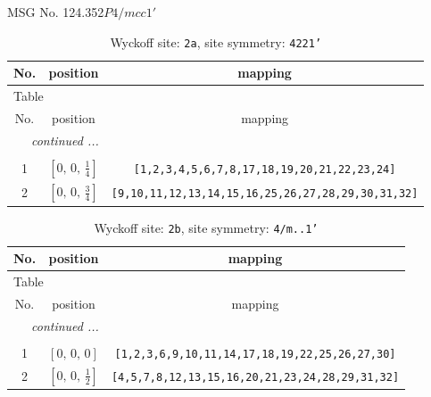 \documentclass[fleqn,8pt]{jsarticle}
\begin{document}
\setcounter{MaxMatrixCols}{32}

\renewcommand{\tablename}{Table~}
\renewcommand{\figurename}{Figure~}
\begin{center}
\LARGE
MSG No. 124.352\quad$P4/mcc1'$
\end{center}
\renewcommand{\arraystretch}{1.2}
\begin{longtable}{ccc}
\caption{Wyckoff site: {\tt 2a}, site symmetry: {\tt 4221'}}
 \\
 \hline \hline
No. & position & mapping \\ \hline \endfirsthead

\multicolumn{2}{l}{\tablename\ \thetable{}} \\
 \hline \hline
No. & position & mapping \\ \hline \endhead

 \hline \hline
\multicolumn{2}{r}{\footnotesize\it continued ...} \\ \endfoot

 \hline \hline
\multicolumn{2}{r}{} \\ \endlastfoot

1 & $\left[ 0,\, 0,\, \frac{1}{4} \right]$ & {\tt [1,2,3,4,5,6,7,8,17,18,19,20,21,22,23,24]} \\ \hline
2 & $\left[ 0,\, 0,\, \frac{3}{4} \right]$ & {\tt [9,10,11,12,13,14,15,16,25,26,27,28,29,30,31,32]} \\
\end{longtable}
\renewcommand{\arraystretch}{1.2}
\begin{longtable}{ccc}
\caption{Wyckoff site: {\tt 2b}, site symmetry: {\tt 4/m..1'}}
 \\
 \hline \hline
No. & position & mapping \\ \hline \endfirsthead

\multicolumn{2}{l}{\tablename\ \thetable{}} \\
 \hline \hline
No. & position & mapping \\ \hline \endhead

 \hline \hline
\multicolumn{2}{r}{\footnotesize\it continued ...} \\ \endfoot

 \hline \hline
\multicolumn{2}{r}{} \\ \endlastfoot

1 & $\left[ 0,\, 0,\, 0 \right]$ & {\tt [1,2,3,6,9,10,11,14,17,18,19,22,25,26,27,30]} \\ \hline
2 & $\left[ 0,\, 0,\, \frac{1}{2} \right]$ & {\tt [4,5,7,8,12,13,15,16,20,21,23,24,28,29,31,32]} \\
\end{longtable}
\end{document}
